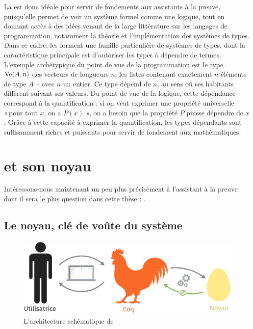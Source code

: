 La  est donc idéale pour servir de fondements aux
assistants à la preuve, puisqu’elle permet de voir un système formel
comme une logique, tout en donnant accès à des idées venant de
la large littérature sur les langages de programmation, notamment
la théorie et l’implémentation des systèmes de types.
Dans ce cadre, les  
forment une famille particulière de systèmes de types, dont la
caractéristique principale est d’autoriser les types à dépendre de termes.
L’exemple archétypique du point de vue de la  programmation est le type
$\operatorname{Ve}(A,n)$ des vecteurs de longueurs $n$,
les listes contenant exactement $n$ éléments de type $A$ – avec $n$ un entier.
Ce type dépend de $n$, au sens où ses habitants diffèrent suivant ses valeurs.
Du point de vue de la logique, cette
dépendance correspond à la quantification : si on veut exprimer
une propriété universelle « pour tout $x$, on a $P(x)$ », on a besoin que la propriété $P$
puisse dépendre de $x$.
Grâce à cette capacité à exprimer la quantification,
les types dépendants sont suffisamment riches et puissants pour
servir de fondement aux mathématiques.

\section{ et son noyau}
\label{sec:intro-coq}

Intéressons-nous maintenant un peu plus précisément à l’assistant à la
preuve dont il sera le plus question dans cette thèse : .

\subsection[Le noyau]{Le noyau, clé de voûte du système}

\begin{figure}[h]

  \centering
  \includegraphics{./figures/coq-kernel-fr.pdf}

  \caption{L’architecture schématique de }
  \label{fig:coq}
\end{figure}

